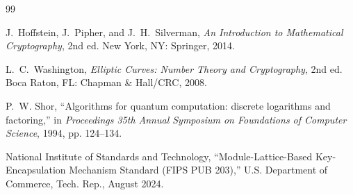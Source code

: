 \documentclass[11pt,a4paper]{article}
\begin{document}
\begin{thebibliography}{99}

J.~Hoffstein, J.~Pipher, and J.~H.~Silverman,
\textit{An Introduction to Mathematical Cryptography}, 2nd ed.
New York, NY: Springer, 2014.

L.~C.~Washington,
\textit{Elliptic Curves: Number Theory and Cryptography}, 2nd ed.
Boca Raton, FL: Chapman \& Hall/CRC, 2008.

P.~W. Shor, ``Algorithms for quantum computation: discrete logarithms and factoring,'' in \emph{Proceedings 35th Annual Symposium on Foundations of Computer Science}, 1994, pp. 124--134.

National Institute of Standards and Technology, ``Module-Lattice-Based Key-Encapsulation Mechanism Standard (FIPS PUB 203),'' U.S. Department of Commerce, Tech. Rep., August 2024.

\end{thebibliography}
\end{document}
